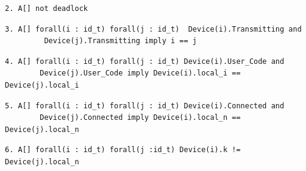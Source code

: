 \begin{lstlisting}[language={[GUI]Uppaal}, % use GUI flavor
columns={[l]flexible},
frameround=fftt, frame=shadowbox, rulesepcolor=\color{gray}, title={The query requires that there is no deadlock in the system.}]
2. A[] not deadlock
\end{lstlisting}

\begin{lstlisting}[language={[GUI]Uppaal}, % use GUI flavor
columns={[l]flexible},
frameround=fftt, frame=shadowbox, rulesepcolor=\color{gray}, title={This requires that if a device \texttt{i}, and a device \texttt{j} are both transmitting, it mean they are the same.}]
3. A[] forall(i : id_t) forall(j : id_t)  Device(i).Transmitting and
		 Device(j).Transmitting imply i == j
\end{lstlisting}
\begin{lstlisting}[language={[GUI]Uppaal}, % use GUI flavor
columns={[l]flexible},
frameround=fftt, frame=shadowbox, rulesepcolor=\color{gray}, title={This query requires that if two devices are both in the location \texttt{User\_Code} they then have the same value of their \texttt{local\_i}}]
4. A[] forall(i : id_t) forall(j : id_t) Device(i).User_Code and 
		Device(j).User_Code imply Device(i).local_i == Device(j).local_i
\end{lstlisting}
\begin{lstlisting}[language={[GUI]Uppaal}, % use GUI flavor
columns={[l]flexible},
frameround=fftt, frame=shadowbox, rulesepcolor=\color{gray}, title={This query requires that if a device \texttt{i} and a device \texttt{j} is both connected, they then have the same value of their \texttt{local\_n}. If they were different it would mean that they are not in the same network, and as such would have different numbers of time-slots in their networks. But the system model makes sure that this is not the case.}]
5. A[] forall(i : id_t) forall(j : id_t) Device(i).Connected and 
		Device(j).Connected imply Device(i).local_n == Device(j).local_n
\end{lstlisting}

\begin{lstlisting}[language={[GUI]Uppaal}, % use GUI flavor
columns={[l]flexible},
frameround=fftt, frame=shadowbox, rulesepcolor=\color{gray}, title={This query requires that if it is always true that all devices never has the the time-slot which one of the devices has locally as the empty-slot. If any device did have this, it would mean that a device was out of sync, since it did not know which time-slot would be the empty one. }]
6. A[] forall(i : id_t) forall(j :id_t) Device(i).k != Device(j).local_n
\end{lstlisting}

